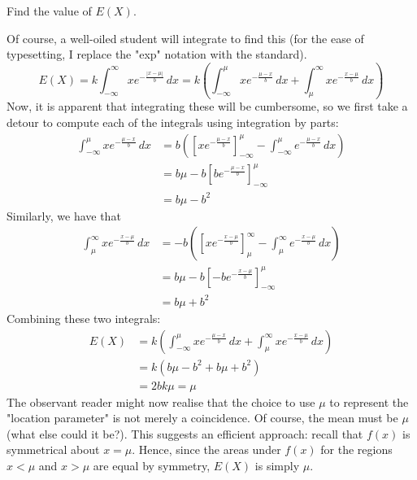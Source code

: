 \documentclass[../main.tex]{subfiles}
\begin{document}
\begin{example}[cont.]
Find the value of $E(X)$.
\end{example}
Of course, a well-oiled student will integrate to find this (for the ease of typesetting, I replace the "exp" notation with the standard).
$$
    E(X)=k\int_{-\infty}^{\infty}xe^{-\frac{|x-\mu|}{b}} \,dx
        =k\left(\int_{-\infty}^{\mu}xe^{-\frac{\mu-x}{b}}\,dx+\int_{\mu}^{\infty}xe^{-\frac{x-\mu}{b}}\,dx\right)
$$
Now, it is apparent that integrating these will be cumbersome, so we first take a detour to compute each of the integrals using integration by parts:
\begin{align*}
    \int_{-\infty}^{\mu}xe^{-\frac{\mu-x}{b}}\,dx
    &=b\left(\left[xe^{-\frac{\mu-x}{b}}\right]_{-\infty}^{\mu}-\int_{-\infty}^{\mu}e^{-\frac{\mu-x}{b}}\,dx\right) \\
    &=b\mu-b\left[be^{-\frac{\mu-x}{b}}\right]_{-\infty}^{\mu} \\
    &= b\mu-b^2
\end{align*}
Similarly, we have that
\begin{align*}
    \int_{\mu}^{\infty}xe^{-\frac{x-\mu}{b}}\,dx
    &=-b\left(\left[xe^{-\frac{x-\mu}{b}}\right]_{\mu}^{\infty}-\int_{\mu}^{\infty}e^{-\frac{x-\mu}{b}}\,dx\right) \\
    &=b\mu-b\left[-be^{-\frac{x-\mu}{b}}\right]_{-\infty}^{\mu} \\
    &= b\mu+b^2
\end{align*}
Combining these two integrals:
\begin{align*}
    E(X)&=k\left(\int_{-\infty}^{\mu}xe^{-\frac{\mu-x}{b}}\,dx+\int_{\mu}^{\infty}xe^{-\frac{x-\mu}{b}}\,dx\right) \\
    &=k(b\mu-b^2+b\mu+b^2) \\
    &= 2bk\mu = \mu
\end{align*}
The observant reader might now realise that the choice to use $\mu$ to represent the "location parameter" is not merely a coincidence.  Of course, the mean must be $\mu$ (what else could it be?). This suggests an efficient approach: recall that $f(x)$ is symmetrical about $x=\mu$. Hence, since the areas under $f(x)$ for the regions $x < \mu$ and $x > \mu$ are equal by symmetry, $E(X)$ is simply $\mu$.
\end{document}
